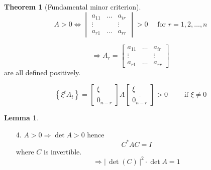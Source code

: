 \documentclass[a4paper,landscape,twocolumn]{article}
\newcommand\abs[1]{|\,#1\,|}
\newcommand\set[1]{\left\{#1\right\}}
\theoremstyle{definition}
\newtheorem{theorem}{Theorem}
\newtheorem{lemma}{Lemma}
\begin{document}
\begin{theorem}[Fundamental minor criterion]
  \[
    A > 0
    \Leftrightarrow
    \begin{vmatrix}
      a_{11} & \ldots & a_{ir} \\
      \vdots &        & \vdots \\
      a_{r1} & \ldots & a_{rr}
    \end{vmatrix}
    > 0
    \quad \text{ for } r = 1,2,\ldots,n
  \]

  \[
    \Rightarrow
    A_r =
    \begin{bmatrix}
      a_{11} & \ldots & a_{ir} \\
      \vdots &        & \vdots \\
      a_{r1} & \ldots & a_{rr}
    \end{bmatrix}
  \]
  are all defined positively.

  \[
    \set{\xi^t A_t} = \begin{bmatrix}
      \xi \\ \overline{0}_{n-r}
    \end{bmatrix} A \begin{bmatrix}
      \xi \\ \overline{0_{n-r}}
    \end{bmatrix}
    > 0
    \qquad \text{ if } \xi \neq 0
  \]
\end{theorem}

\begin{lemma}
  \label{lemma-8.30}
  \begin{enumerate}
    \item[4.]
      $A > 0 \Rightarrow \det{A} > 0$
      hence
      \[ C^* A C = I \]
      where $C$ is invertible.
      \[ \Rightarrow \abs{\det(C)}^2 \cdot \det{A} = 1 \]
  \end{enumerate}
\end{lemma}
\end{document}
